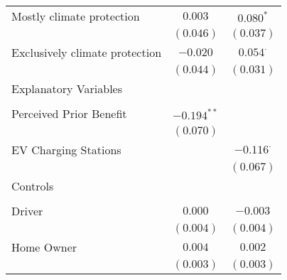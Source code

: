 \begin{center}
\begin{tiny}
\begin{longtable}{l@{} c@{} c@{}}
\quad Mostly climate protection                                                      & $0.003$         & $0.080^{*}$      \\
                                                                                     & $(0.046)$       & $(0.037)$        \\
\quad Exclusively climate protection                                                 & $-0.020$        & $0.054^{\cdot}$  \\
                                                                                     & $(0.044)$       & $(0.031)$        \\
Explanatory Variables                                                                &                 &                  \\
                                                                                     &                 &                  \\
\quad Perceived Prior Benefit                                                        & $-0.194^{**}$   &                  \\
                                                                                     & $(0.070)$       &                  \\
\quad EV Charging Stations                                                           &                 & $-0.116^{\cdot}$ \\
                                                                                     &                 & $(0.067)$        \\
Controls                                                                             &                 &                  \\
                                                                                     &                 &                  \\
\quad Driver                                                                         & $0.000$         & $-0.003$         \\
                                                                                     & $(0.004)$       & $(0.004)$        \\
\quad Home Owner                                                                     & $0.004$         & $0.002$          \\
                                                                                     & $(0.003)$       & $(0.003)$        \\

\end{longtable}
\end{tiny}
\end{center}
